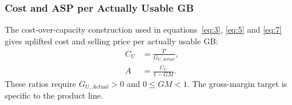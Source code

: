 \begin{center}
\resizebox{.56\linewidth}{!}{}
\end{center}


\subsubsection*{Cost and ASP per Actually Usable GB}

The cost-over-capacity construction used in equations~\eqref{eq:3},
\eqref{eq:5} and \eqref{eq:7} gives uplifted cost and selling price per
actually usable GB:
\begin{align}
C_U&=\frac{T'}{G_{U,Actual}},\label{eq:22}\\
A&=\frac{C_U}{1-GM}.\label{eq:23}
\end{align}
These ratios require \(G_{U,Actual}>0\) and \(0\leq GM<1\).
The gross-margin target is specific to the product line.
